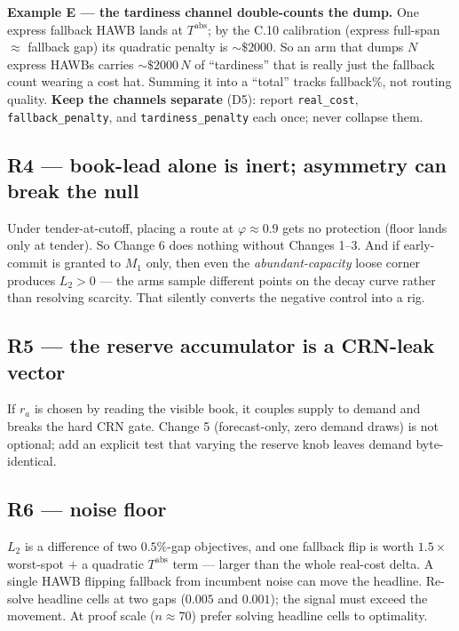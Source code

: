 \documentclass[11pt]{article}
\newcommand{\resv}{r}
\newcommand{\code}[1]{\texttt{#1}}
\begin{document}
\begin{mdframed}[backgroundcolor=red!5,linewidth=0.4pt]
\textbf{Example E --- the tardiness channel double-counts the dump.} One express fallback HAWB lands at
$T^{\mathrm{abs}}$; by the C.10 calibration (express full-span $\approx$ fallback gap) its quadratic
penalty is $\sim\$2000$. So an arm that dumps $N$ express HAWBs carries $\sim\$2000\,N$ of ``tardiness''
that is really just the fallback count wearing a cost hat. Summing it into a ``total'' tracks fallback\%,
not routing quality. \textbf{Keep the channels separate} (D5): report \code{real\_cost},
\code{fallback\_penalty}, and \code{tardiness\_penalty} each once; never collapse them.
\end{mdframed}

\subsection{R4 --- book-lead alone is inert; asymmetry can break the null}
Under tender-at-cutoff, placing a route at $\varphi\approx0.9$ gets no protection (floor lands only at
tender). So Change 6 does nothing without Changes 1--3. And if early-commit is granted to $M_1$ only, then
even the \emph{abundant-capacity} loose corner produces $L_2>0$ --- the arms sample different points on the
decay curve rather than resolving scarcity. That silently converts the negative control into a rig.

\subsection{R5 --- the reserve accumulator is a CRN-leak vector}
If $\resv_a$ is chosen by reading the visible book, it couples supply to demand and breaks the hard CRN
gate. Change 5 (forecast-only, zero demand draws) is not optional; add an explicit test that varying the
reserve knob leaves demand byte-identical.

\subsection{R6 --- noise floor}
$L_2$ is a difference of two $0.5\%$-gap objectives, and one fallback flip is worth
$1.5\times$worst-spot $+$ a quadratic $T^{\mathrm{abs}}$ term --- larger than the whole real-cost delta.
A single HAWB flipping fallback from incumbent noise can move the headline. Re-solve headline cells at two
gaps ($0.005$ and $0.001$); the signal must exceed the movement. At proof scale ($n\approx70$) prefer
solving headline cells to optimality.
\end{document}
